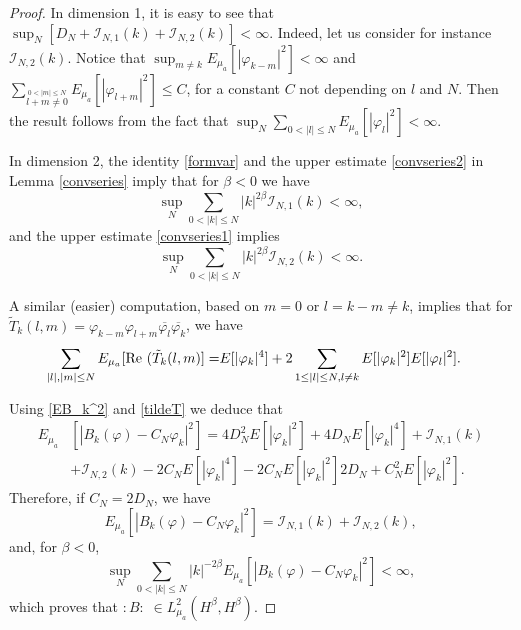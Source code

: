 \documentclass[11pt,leqno]{amsart}
\begin{document}
\begin{proof}
 In dimension 1, it is easy to see that  $\sup_N [D_N+{\mathcal I}_{N,1}(k)+{\mathcal I}_{N,2}(k) ] <\infty$.  Indeed, let us consider for instance ${\mathcal I}_{N,2}(k)$. { 
 Notice that %
 $\sup_{m\neq k}  E_{\mu_a} [|\varphi_{k-m}|^2]<\infty $}
  and $\sum_{\stackrel{0<|m|\leq N} {  l+m\neq 0}} E_{\mu_a} [|\varphi_{l+m}|^2] \leq C$, for a constant $C$ not depending on $l$ and $N$. 
 Then the result follows from the fact that  $\sup_N \sum_{0<|l|\leq N} E_{\mu_a} [|\varphi_{l}|^2] <\infty $. 
\smallskip

In dimension 2,  the identity \eqref{formvar} and the upper estimate \eqref{convseries2} in Lemma \ref{convseries} imply that
for $\beta <0$ we have 
\[ \sup_N \sum_{0<|k|\leq N} |k|^{2\beta} {\mathcal I}_{N,1}(k) <\infty,\]
and the upper estimate \eqref{convseries1} implies 
\[ \sup_N \sum_{0<|k|\leq N} |k|^{2\beta} {\mathcal I}_{N,2}(k) <\infty.\]




A similar (easier) computation, based on $m=0$ {or  $ l=k-m\neq k$},  implies that for $\tilde{T}_k(l,m)= \varphi_{k-m} \varphi_{l+m} \overline{\varphi_l} \overline{\varphi_k}$,  we have 
\begin{align} \label{tildeT}
 \sum_{ |l|,|m|\leq N} E_{\mu_a}[ \mbox{\rm Re }( \tilde{T}_k(l,m) ]=& E[|\varphi_k|^4] +2  \sum_{1\leq |l|\leq N, l\neq k}  E[|\varphi_k|^2] E[|\varphi_l|^2]. 
\end{align} 


Using \eqref{EB_k^2} and \eqref{tildeT} we deduce that 
\begin{align*}
E_{\mu_a} &[|B_k (\varphi)-C_N \varphi_k|^{2}] =
 4 D_N^2  E[ |\varphi_k|^{2}] +4   D_N E[ |\varphi_k|^{4}] +  {\mathcal I}_{N,1} (k) \\
& + {\mathcal I}_{N,2}(k)  -2 C_N  E[|\varphi_k|^4]  
 -2 C_N  E[|\varphi_k|^2] 2 D_N 
+ C_N^2 E[|\varphi_k|^2]. 
\end{align*} 
Therefore, if $C_N=2D_N$, we have 
\[  
E_{\mu_a} [|B_k (\varphi)-C_N \varphi_k|^{2}] =  {\mathcal I}_{N,1}(k) + {\mathcal I}_{N,2}(k) , \] 
and, for $\beta <0$, 
\[ \sup_N \sum_{0<|k| \leq N} |k|^{-2\beta} E_{\mu_a} [|B_k (\varphi)-C_N \varphi_k|^{2}] <\infty,\]
 which proves that $:B:\; \in L^2_{\mu_a}(H^\beta , H^\beta)$.
\smallskip


 



\end{proof}
\end{document}
